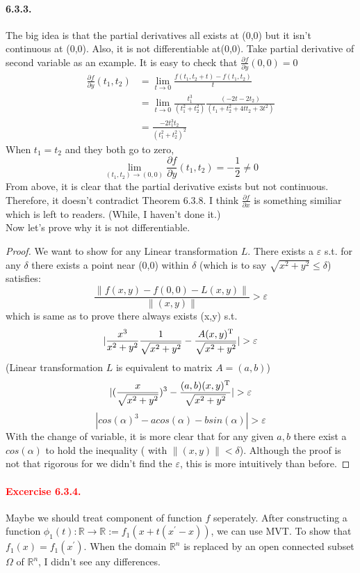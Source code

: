 \paragraph{6.3.3.}The big idea is that the partial derivatives all exists at (0,0) but it isn't continuous at (0,0). Also, it is not differentiable at(0,0).
Take partial derivative of second variable as an example. It is easy to check that $\frac{\partial f}{\partial y}(0,0)=0$
\begin{align}
\frac{\partial f}{\partial y}(t_{1},t_{2})&=\lim_{t\rightarrow 0}\frac{f(t_{1},t_{2}+t)-f(t_{1},t_{2})}{t}
\\&=\lim_{t\rightarrow 0}\frac{t_{1}^3}{(t_{1}^2+t_{2}^2)}\frac{(-2t-2t_{2})}{(t_{1}+t_{2}^2+4tt_{2}+3t^2)}\\
&=\frac{-2t_{1}^3t_{2}}{(t_{1}^2+t_{2}^2)^2}
\end{align}
When $t_{1}=t_{2}$ and they both go to zero,
\[\lim_{(t_{1},t_{2})\rightarrow (0,0)}\frac{\partial f}{\partial y}(t_{1},t_{2})=-\frac{1}{2}\neq0\]
From above, it is clear that the partial derivative exists but not continuous. Therefore, it doesn't contradict Theorem 6.3.8. I think $\frac{\partial f}{\partial x}$ is something similiar which is left to readers. (While, I haven't done it.)\\Now let's prove why it is not differentiable.
\begin{proof}
We want to show for any Linear transformation $L$. There exists a $\varepsilon$ s.t. for any $\delta$ there exists a point near (0,0) within $\delta$ (which is to say $\sqrt{x^2+y^2}\leq\delta$) satisfies:
\[\frac{\|f(x,y)-f(0,0)-L(x,y)\|}{\|(x,y)\|}>\varepsilon
\]
which is same as to prove there always exists (x,y) s.t.
\[|\frac{x^3}{x^2+y^2}\frac{1}{\sqrt{x^2+y^2}}-\frac{A(x,y)\trans}{\sqrt{x^2+y^2}}|>\varepsilon
\]
(Linear transformation $L$ is equivalent to matrix $A=(a,b)$)
\[|(\frac{x}{\sqrt{x^2+y^2}})^3-\frac{(a,b)(x,y)\trans}{\sqrt{x^2+y^2}}|>\varepsilon
\]
\[|cos(\alpha)^3-acos(\alpha)-bsin(\alpha)|>\varepsilon
\]
With the change of variable, it is more clear that for any given $a, b$ there exist a $cos(\alpha)$ to hold the inequality ( with $\|(x,y)\|<\delta$). Although the proof is not that rigorous for we didn't find the $\varepsilon$, this is more intuitively than before.
\end{proof}
\paragraph{\textcolor{red}{Excercise 6.3.4.}} Maybe we should treat component of function $f$ seperately. After constructing a function $\phi_{1}(t): \mathbb{R}\rightarrow\mathbb{R} := f_{1}(x+t(x^\prime-x))$, we can use MVT. To show that $f_{1}(x)=f_{1}(x^\prime)$. When the domain $\mathbb{R}^n$ is replaced by an open connected subset $\Omega$ of $\mathbb{R}^n$, I didn't see any differences.

